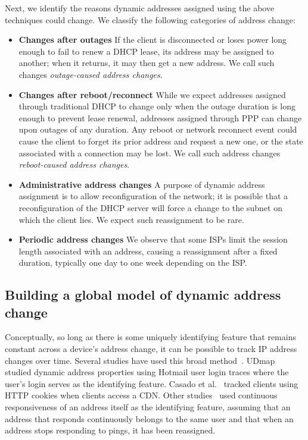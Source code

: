 Next, we identify the reasons dynamic addresses assigned using
the above techniques could change. We classify the following categories of address change:

\begin{itemize}
\item{\textbf{Changes after outages}} If the client is
  disconnected or loses power long enough to fail to renew a DHCP lease,
  its address may be assigned to another; when it returns,
  it may then get a new address. We call such changes
  \emph{outage-caused address changes}.

\item{\textbf{Changes after reboot/reconnect}} While we
  expect addresses assigned through traditional DHCP to change only when the
  outage duration is long enough to prevent lease renewal, addresses
  assigned through PPP can change upon outages of any duration. Any reboot or
  network reconnect event could cause the client
  to forget its prior address and request a new one, or the
  state associated with a connection may be lost.
  We call such
  address changes \emph{reboot-caused address changes}. 
  

\item{\textbf{Administrative address changes}} A purpose of
  dynamic address assignment is to allow reconfiguration of
  the network; it is possible that a reconfiguration of the
  DHCP server will force a change to the subnet on which the
  client lies.  We expect such reassignment to be rare.
  
\item{\textbf{Periodic address changes}} We observe that
  some ISPs limit the session length associated with an
  address, causing a reassignment after a fixed duration,
  typically one day to one week depending on the ISP.

\end{itemize}

\subsection{Building a global model of dynamic address change}

Conceptually, so long as there is some uniquely identifying feature
that remains constant across a device's address change,
it can be possible to track IP address changes over time. Several studies have used this broad
method~\cite{udmap, census-survey, zmap-dhcp,
maier2009dominant, dhcp-gatech, peering-shroud, dhcp-dimes}. 
UDmap~\cite{udmap} studied
dynamic address properties using Hotmail user login
traces where the user's login serves as the identifying
feature. Casado et al.~\cite{peering-shroud} tracked clients using HTTP cookies when
clients access a CDN. Other studies~\cite{zmap-dhcp, census-survey} used continuous
responsiveness of an address itself as the identifying feature, assuming
that an address that responds continuously belongs to the same user and that
when an address stops responding to pings, it has been
reassigned. 

